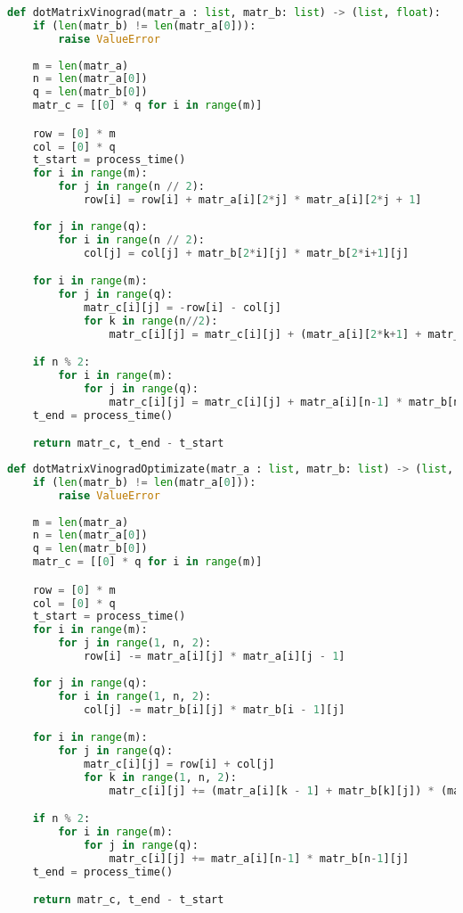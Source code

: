         \begin{lstlisting}[language=python, label=lst:vinogradDot, caption=Реализация алгоритма Винограда умножения матриц]
def dotMatrixVinograd(matr_a : list, matr_b: list) -> (list, float):
    if (len(matr_b) != len(matr_a[0])):
        raise ValueError
    
    m = len(matr_a)
    n = len(matr_a[0])
    q = len(matr_b[0])
    matr_c = [[0] * q for i in range(m)]

    row = [0] * m
    col = [0] * q
    t_start = process_time()
    for i in range(m):
        for j in range(n // 2):
            row[i] = row[i] + matr_a[i][2*j] * matr_a[i][2*j + 1]
    
    for j in range(q):
        for i in range(n // 2):
            col[j] = col[j] + matr_b[2*i][j] * matr_b[2*i+1][j]

    for i in range(m):
        for j in range(q):
            matr_c[i][j] = -row[i] - col[j]
            for k in range(n//2):
                matr_c[i][j] = matr_c[i][j] + (matr_a[i][2*k+1] + matr_b[2*k][j]) * (matr_a[i][2*k] + matr_b[2*k+1][j])

    if n % 2:
        for i in range(m):
            for j in range(q):
                matr_c[i][j] = matr_c[i][j] + matr_a[i][n-1] * matr_b[n-1][j]
    t_end = process_time()

    return matr_c, t_end - t_start
        \end{lstlisting}

        \begin{lstlisting}[language=python, label=lst:vinogradDot:optimize, caption=Реализация оптимизированного алгоритма Винограда умножения матриц]
def dotMatrixVinogradOptimizate(matr_a : list, matr_b: list) -> (list, float):
    if (len(matr_b) != len(matr_a[0])):
        raise ValueError
    
    m = len(matr_a)
    n = len(matr_a[0])
    q = len(matr_b[0])
    matr_c = [[0] * q for i in range(m)]

    row = [0] * m
    col = [0] * q
    t_start = process_time()
    for i in range(m):
        for j in range(1, n, 2):
            row[i] -= matr_a[i][j] * matr_a[i][j - 1]
    
    for j in range(q):
        for i in range(1, n, 2):
            col[j] -= matr_b[i][j] * matr_b[i - 1][j]

    for i in range(m):
        for j in range(q):
            matr_c[i][j] = row[i] + col[j]
            for k in range(1, n, 2):
                matr_c[i][j] += (matr_a[i][k - 1] + matr_b[k][j]) * (matr_a[i][k] + matr_b[k-1][j])

    if n % 2:
        for i in range(m):
            for j in range(q):
                matr_c[i][j] += matr_a[i][n-1] * matr_b[n-1][j]
    t_end = process_time()

    return matr_c, t_end - t_start
        \end{lstlisting}
    
